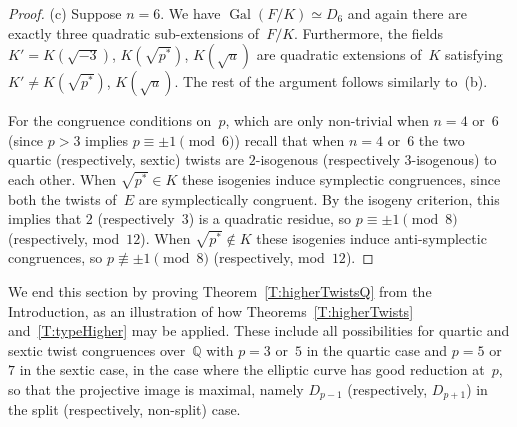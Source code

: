 \documentclass[twoside,leqno,symbols-for-thanks, draft]{rmi}
\numberwithin{equation}{section}
\newcommand{\Q}{\mathbb{Q}}
\DeclareMathOperator{\Gal}{Gal}
\theoremstyle{remark}
\begin{document}
\begin{proof}
(c) Suppose $n=6$. We have $\Gal(F/K) \simeq D_6$ and again there are exactly three quadratic sub-extensions of~$F/K$.
Furthermore, the fields 
$K'=K(\sqrt{-3})$, $K(\sqrt{p^*})$, $K(\sqrt{u})$ 
are quadratic extensions of~$K$ satisfying
$K' \neq K(\sqrt{p^*})$, $K(\sqrt{u})$. 
The rest of the argument follows similarly to~(b).

For the congruence conditions on~$p$, which are only non-trivial when
$n=4$ or~$6$ (since $p>3$ implies $p\equiv\pm1\pmod6$) recall that
when $n=4$ or~$6$ the two quartic (respectively, sextic) twists are
$2$-isogenous (respectively $3$-isogenous) to each other.  When
$\sqrt{p^*}\in K$ these isogenies induce symplectic congruences, since
both the twists of~$E$ are symplectically congruent.  By the isogeny
criterion, this implies that $2$ (respectively~$3$) is a quadratic
residue, so $p\equiv\pm1\pmod{8}$ (respectively, mod~$12$).  When
$\sqrt{p^*}\notin K$ these isogenies induce anti-symplectic
congruences, so $p\not\equiv\pm1\pmod{8}$ (respectively, mod~$12$).
\end{proof}

We end this section by proving Theorem~\ref{T:higherTwistsQ} from the
Introduction, as an illustration of how Theorems~\ref{T:higherTwists}
and~\ref{T:typeHigher} may be applied.  These include all
possibilities for quartic and sextic twist congruences over~$\Q$ with
$p=3$ or~$5$ in the quartic case and $p=5$ or~$7$ in the sextic case,
in the case where the elliptic curve has good reduction at~$p$, so
that the projective image is maximal, namely $D_{p-1}$ (respectively,
$D_{p+1}$) in the split (respectively, non-split) case.
\end{document}
